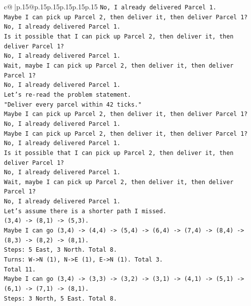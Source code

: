 \documentclass{article}
\begin{document}
{\begin{supertabular}{c@{$\;$}|p{.15\linewidth}@{}p{.15\linewidth}p{.15\linewidth}p{.15\linewidth}p{.15\linewidth}p{.15\linewidth}}
{{{\texttt{No, I already delivered Parcel 1.} \\
\texttt{Maybe I can pick up Parcel 2, then deliver it, then deliver Parcel 1?} \\
\texttt{No, I already delivered Parcel 1.} \\
\texttt{Is it possible that I can pick up Parcel 2, then deliver it, then deliver Parcel 1?} \\
\texttt{No, I already delivered Parcel 1.} \\
\texttt{Wait, maybe I can pick up Parcel 2, then deliver it, then deliver Parcel 1?} \\
\texttt{No, I already delivered Parcel 1.} \\
\texttt{Let's re{-}read the problem statement.} \\
\texttt{"Deliver every parcel within 42 ticks."} \\
\texttt{Maybe I can pick up Parcel 2, then deliver it, then deliver Parcel 1?} \\
\texttt{No, I already delivered Parcel 1.} \\
\texttt{Maybe I can pick up Parcel 2, then deliver it, then deliver Parcel 1?} \\
\texttt{No, I already delivered Parcel 1.} \\
\texttt{Is it possible that I can pick up Parcel 2, then deliver it, then deliver Parcel 1?} \\
\texttt{No, I already delivered Parcel 1.} \\
\texttt{Wait, maybe I can pick up Parcel 2, then deliver it, then deliver Parcel 1?} \\
\texttt{No, I already delivered Parcel 1.} \\
\texttt{Let's assume there is a shorter path I missed.} \\
\texttt{(3,4) {-}> (8,1) {-}> (5,3).} \\
\texttt{Maybe I can go (3,4) {-}> (4,4) {-}> (5,4) {-}> (6,4) {-}> (7,4) {-}> (8,4) {-}> (8,3) {-}> (8,2) {-}> (8,1).} \\
\texttt{Steps: 5 East, 3 North. Total 8.} \\
\texttt{Turns: W{-}>N (1), N{-}>E (1), E{-}>N (1). Total 3.} \\
\texttt{Total 11.} \\
\texttt{Maybe I can go (3,4) {-}> (3,3) {-}> (3,2) {-}> (3,1) {-}> (4,1) {-}> (5,1) {-}> (6,1) {-}> (7,1) {-}> (8,1).} \\
\texttt{Steps: 3 North, 5 East. Total 8.} \\
}}}
\end{supertabular}}
\end{document}
